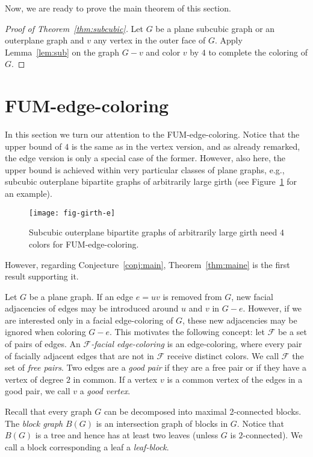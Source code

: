 \documentclass[a4paper,12pt]{article}
\begin{document}
Now, we are ready to prove the main theorem of this section.

\begin{proof}[Proof of Theorem~\ref{thm:subcubic}]
	Let $G$ be a plane subcubic graph or an outerplane graph and $v$ any vertex in the outer face of $G$.
	Apply Lemma~\ref{lem:sub} on the graph $G-v$ and color $v$ by $4$ to complete the coloring of $G$.
\end{proof}



\section{FUM-edge-coloring}
\label{sec:e}

In this section we turn our attention to the FUM-edge-coloring.
Notice that the upper bound of $4$ is the same as in the vertex version, and as already remarked,
the edge version is only a special case of the former. However, also here, the upper bound is achieved
within very particular classes of plane graphs, e.g., subcubic outerplane bipartite graphs of arbitrarily large girth
(see Figure~\ref{fig:girth-e} for an example).
\begin{figure}[htp!]
	\begin{center}
	\texttt{[image: fig-girth-e]}
	\end{center}
	\caption{Subcubic outerplane bipartite graphs of arbitrarily large girth need $4$ colors for FUM-edge-coloring.}
	\label{fig:girth-e}
\end{figure}
However, regarding Conjecture~\ref{conj:main}, Theorem~\ref{thm:maine} is the first result supporting it.

Let $G$ be a plane graph.
If an edge $e=uv$ is removed from $G$, new facial adjacencies of edges may be introduced around $u$ and $v$ in $G-e$.
However, if we are interested only in a facial edge-coloring of $G$,
these new adjacencies may be ignored when coloring $G-e$.
This motivates the following concept:
let $\mathcal{F}$ be a set of pairs of edges.
An \emph{$\mathcal{F}$-facial edge-coloring} is an edge-coloring, where every pair of facially adjacent edges
that are not in $\mathcal{F}$ receive distinct colors.
We call $\mathcal{F}$ the set of \emph{free pairs}.
Two edges are a \emph{good pair} if they are a free pair or if they have a vertex of degree $2$ in common.
If a vertex $v$ is a common vertex of the edges in a good pair, we call $v$ a \emph{good vertex}.


Recall that every graph $G$ can be decomposed into maximal 2-connected blocks.
The \emph{block graph} $B(G)$ is an intersection graph of blocks in $G$.
Notice that $B(G)$ is a tree and hence has at least two leaves (unless $G$ is $2$-connected).
We call a block corresponding a leaf a \emph{leaf-block}.
\end{document}
